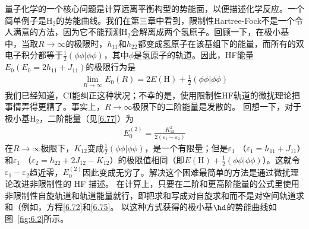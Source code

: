 量子化学的一个核心问题是计算远离平衡构型的势能面，以便描述化学反应。一个简单例子是$\mathrm{H_2}$的势能曲线。我们在第三章中看到，限制性Hartree-Fock不是一个令人满意的方法，因为它不能预测$\mathrm{H_2}$会解离成两个氢原子。回顾一下，在极小基中，当取$R\to\infty$的极限时，$h_{11}$和$h_{22}$都变成氢原子在该基组下的能量，而所有的双电子积分都等于$\frac{1}{2}(\phi\phi|\phi\phi)$，其中$\phi$是氢原子的轨道。因此，HF能量$E_0(E_0=2h_{11}+J_{11})$的极限行为是
\begin{align}
	\lim_{R\to\infty} E_0(R) = 2E(\mathrm{H}) + \frac{1}{2}(\phi\phi|\phi\phi)
\end{align}
我们已经知道，CI能纠正这种状况；不幸的是，使用限制性HF轨道的微扰理论把事情弄得更糟了。事实上，$R\to\infty$极限下的二阶能量是发散的。 回想一下，对于极小基$\mathrm{H_2}$，二阶能量（见\autoref{6.77}）为
\begin{align}
	E_0^{(2)}  = \frac{K_{12}^2}{2(\varepsilon_1 - \varepsilon_2)}
\end{align}
在$R\to\infty$极限下，$K_{12}$变成$\frac{1}{2}(\phi\phi|\phi\phi)$，是一个有限量；但是$\varepsilon_1$ （$\varepsilon_1=h_{11}+J_{11}$）和$\varepsilon_1$ （$\varepsilon_2=h_{22}+2J_{12}-K_{12}$）的极限值相同（即$E(\mathrm{H})+\frac{1}{2}(\phi\phi|\phi\phi)$）。这就令$\varepsilon_1-\varepsilon_2$趋近零，$E_0^{(2)}$因此变成无穷了。解决这个困难最简单的方法是通过微扰理论改进非限制性的 HF 描述。 在计算上，只要在二阶和更高阶能量的公式里使用非限制性自旋轨道和轨道能量就行，即把求和写成对自旋求和而不是对空间轨道求和（例如，方程\autoref{6.72}和\autoref{6.75}。 以这种方式获得的极小基$\hd$的势能曲线如图~\autoref{fig:6.2}所示。
